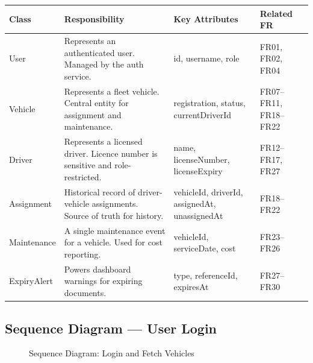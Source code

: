 \documentclass[11pt,a4paper]{article}
\begin{document}
\begin{table}[H]
\centering
\begin{tabularx}{\textwidth}{|p{2.5cm}|p{5cm}|p{3cm}|p{2cm}|}
\hline
\textbf{Class} & \textbf{Responsibility} & \textbf{Key Attributes} & \textbf{Related FR} \\
\hline
User & Represents an authenticated user. Managed by the auth service. & id, username, role & FR01, FR02, FR04 \\
\hline
Vehicle & Represents a fleet vehicle. Central entity for assignment and maintenance. & registration, status, currentDriverId & FR07--FR11, FR18--FR22 \\
\hline
Driver & Represents a licensed driver. Licence number is sensitive and role-restricted. & name, licenseNumber, licenseExpiry & FR12--FR17, FR27 \\
\hline
Assignment & Historical record of driver-vehicle assignments. Source of truth for history. & vehicleId, driverId, assignedAt, unassignedAt & FR18--FR22 \\
\hline
Maintenance & A single maintenance event for a vehicle. Used for cost reporting. & vehicleId, serviceDate, cost & FR23--FR26 \\
\hline
ExpiryAlert & Powers dashboard warnings for expiring documents. & type, referenceId, expiresAt & FR27--FR30 \\
\hline
\end{tabularx}
\end{table}

\subsection{Sequence Diagram --- User Login}

\begin{figure}[H]
\centering
{}
\caption{Sequence Diagram: Login and Fetch Vehicles}
\label{fig:sequence}
\end{figure}
\end{document}
